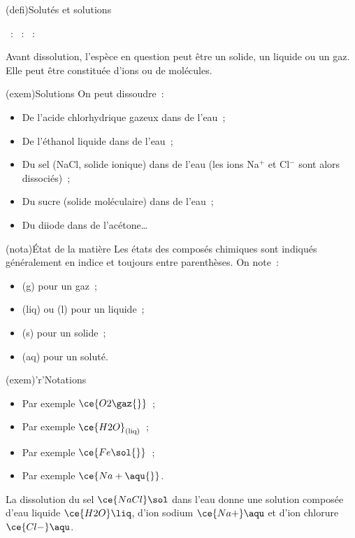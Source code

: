 \documentclass[../../main/main.tex]{subfiles}
\begin{document}
\begin{tcb}[label=def:solu](defi){Solutés et solutions}
	\begin{itemize}
		~: 
		~: 
		~: 
	\end{itemize}
	Avant dissolution, l'espèce en question peut être un solide, un liquide
	ou un gaz. Elle peut être constituée d'ions ou de molécules.
\end{tcb}
\begin{tcb}[label=exem:solution](exem){Solutions}
	On peut dissoudre~:
	\begin{itemize}
		\item De l'acide chlorhydrique gazeux dans de l'eau~;
		\item De l'éthanol liquide dans de l'eau~;
		\item Du sel (NaCl, solide ionique) dans de l'eau (les ions Na$^+$ et
		      Cl$^-$ sont alors dissociés)~;
		\item Du sucre (solide moléculaire) dans de l'eau~;
		\item Du diiode dans de l'acétone…
	\end{itemize}
\end{tcb}

\begin{tcbraster}[raster columns=2, raster equal height=rows]
	\begin{tcb}[label=nota:état](nota){État de la matière}
		Les états des composés chimiques sont indiqués généralement en indice et
		toujours entre parenthèses. On note~:
		\begin{itemize}
			\item (g) pour un gaz~;
			\item (liq) ou (l) pour un liquide~;
			\item (s) pour un solide~;
			\item (aq) pour un soluté.
		\end{itemize}
	\end{tcb}
	\begin{tcb}[label=exem:notationétat](exem)'r'{Notations}
		\begin{itemize}
			\item Par exemple $\ce{O2\gaz{}}$~;
			\item Par exemple $\ce{H2O}_{\rm (liq)}$~;
			\item Par exemple $\ce{Fe\sol{}}$~;
			\item Par exemple $\ce{Na+\aqu{}}$.
		\end{itemize}
		La dissolution du sel $\ce{NaCl}\sol$ dans l'eau donne une solution composée
		d'eau liquide $\ce{H2O}\liq$, d'ion sodium $\ce{Na+}\aqu$ et d'ion chlorure
		$\ce{Cl-}\aqu$.
	\end{tcb}
\end{tcbraster}
\end{document}
